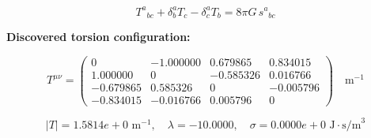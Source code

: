 
\begin{equation}
  T^a{}_{bc} + \delta^a_b T_c - \delta^a_c T_b = 8\pi G \, s^a{}_{bc}
\end{equation}

\textbf{Discovered torsion configuration:}

\begin{equation}
  T^{\mu\nu} = \begin{pmatrix}
    0 & -1.000000 & 0.679865 & 0.834015 \\
    1.000000 & 0 & -0.585326 & 0.016766 \\
    -0.679865 & 0.585326 & 0 & -0.005796 \\
    -0.834015 & -0.016766 & 0.005796 & 0
  \end{pmatrix} \quad \text{m}^{-1}
\end{equation}

\begin{equation}
  |T| = 1.5814e+0 \text{ m}^{-1}, \quad
  \lambda = -10.0000, \quad
  \sigma = 0.0000e+0 \text{ J}\cdot\text{s/m}^3
\end{equation}